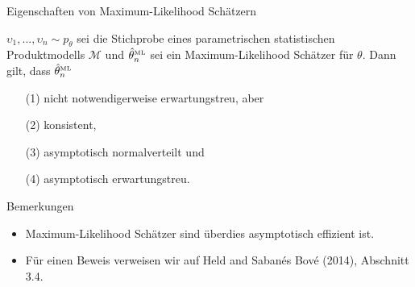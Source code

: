 \documentclass[
  8pt,
  ignorenonframetext,
]{beamer}
\providecommand{\tightlist}{%
  \setlength{\itemsep}{0pt}\setlength{\parskip}{0pt}}
\newcommand{\ups} {\upsilon}
\begin{document}
\begin{frame}{Eigenschaften von Maximum-Likelihood Schätzern}
\protect\hypertarget{eigenschaften-von-maximum-likelihood-schuxe4tzern}{}
\small
\begin{theorem}
\normalfont
\justifying
$\ups_1,...,\ups_n \sim p_\theta$ sei die Stichprobe eines parametrischen 
statistischen Produktmodells $\mathcal{M}$ und $\hat{\theta}_n^{\mbox{\tiny{ML}}}$ 
sei ein Maximum-Likelihood Schätzer für $\theta$. Dann gilt, dass 
$\hat{\theta}_n^{\mbox{\tiny{ML}}}$
\begin{itemize}
\item[(1)] nicht notwendigerweise erwartungstreu, aber
\item[(2)] konsistent,
\item[(3)] asymptotisch normalverteilt und
\item[(4)] asymptotisch erwartungstreu.
\end{itemize}
\end{theorem}

Bemerkungen

\begin{itemize}
\tightlist
\item
  Maximum-Likelihood Schätzer sind überdies asymptotisch effizient ist.
\item
  Für einen Beweis verweisen wir auf Held and Sabanés Bové (2014),
  Abschnitt 3.4.
\end{itemize}
\end{frame}
\end{document}
